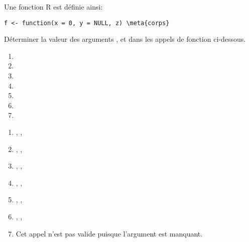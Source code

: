 \begin{exercice}
  Une fonction R est définie ainsi:
\begin{Schunk}
\begin{Verbatim}[commandchars=\\\{\}]
f <- function(x = 0, y = NULL, z) \meta{corps}
\end{Verbatim}
\end{Schunk}
  Déterminer la valeur des arguments ,  et 
  dans les appels de fonction ci-dessous.
  \begin{enumerate}
  \item {}
  \item {}
  \item {}
  \item {}
  \item {}
  \item {}
  \item {}
  \end{enumerate}
  \begin{sol}
    \begin{enumerate}
    \item {}, , 
    \item {}, , 
    \item {}, , 
    \item {}, , 
    \item {}, , 
    \item {}, , 
    \item {} %
      Cet appel n'est pas valide puisque l'argument  est
      manquant.
    \end{enumerate}
  \end{sol}
\end{exercice}


